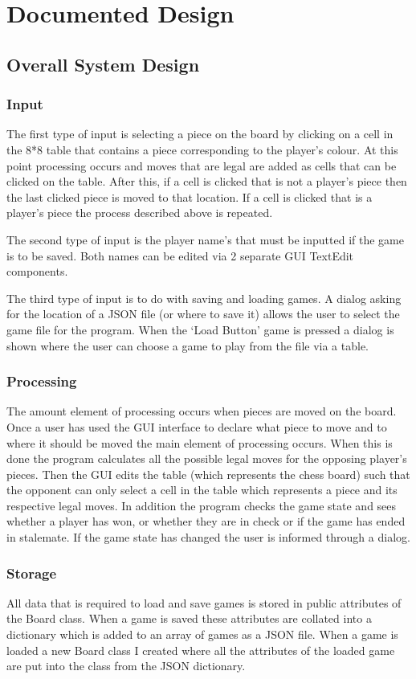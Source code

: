 \documentclass[]{report}
\begin{document}
\chapter{Documented Design}
\section{Overall System Design}
\subsection{Input}
The first type of input is selecting a piece on the board by clicking on a cell in the 8*8 table that contains a piece corresponding to the player's colour. At this point processing occurs and moves that are legal are added as cells that can be clicked on the table. After this, if a cell is clicked that is not a player's piece then the last clicked piece is moved to that location. If a cell is clicked that is a player's piece the process described above is repeated.

The second type of input is the player name's that must be inputted if the game is to be saved. Both names can be edited via 2 separate GUI TextEdit components. 

The third type of input is to do with saving and loading games. A dialog asking for the location of a JSON file (or where to save it) allows the user to select the game file for the program. When the ‘Load Button' game is pressed a dialog is shown where the user can choose a game to play from the file via a table.
\subsection{Processing}
The amount element of processing occurs when pieces are moved on the board. Once a user has used the GUI interface to declare what piece to move and to where it should be moved the main element of processing occurs. When this is done the program calculates all the possible legal moves for the opposing player's pieces. Then the GUI edits the table (which represents the chess board) such that the opponent can only select a cell in the table which represents a piece and its respective legal moves. In addition the program checks the game state and sees whether a player has won, or whether they are in check or if the game has ended in stalemate. If the game state has changed the user is informed through a dialog. 
\subsection{Storage}
All data that is required to load and save games is stored in public attributes of the Board class. When a game is saved these attributes are collated into a dictionary which is added to an array of games as a JSON file. When a game is loaded a new Board class I created where all the attributes of the loaded game are put into the class from the JSON dictionary.
\end{document}
